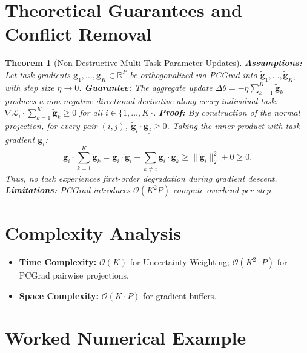 \documentclass[11pt]{article}
\newtheorem{theorem}{Theorem}
\begin{document}
\section{Theoretical Guarantees and Conflict Removal}
\label{sec:guarantees}

\begin{theorem}[Non-Destructive Multi-Task Parameter Updates]
\label{thm:pcgrad_non_destructive}
\textbf{Assumptions:} Let task gradients $\mathbf{g}_1, \dots, \mathbf{g}_K \in \mathbb{R}^P$ be orthogonalized via PCGrad into $\tilde{\mathbf{g}}_1, \dots, \tilde{\mathbf{g}}_K$, with step size $\eta \to 0$.
\textbf{Guarantee:} The aggregate update $\Delta\theta = -\eta \sum_{k=1}^K \tilde{\mathbf{g}}_k$ produces a non-negative directional derivative along every individual task: $\nabla\mathcal{L}_i \cdot \sum_{k=1}^K \tilde{\mathbf{g}}_k \ge 0$ for all $i \in \{1, \dots, K\}$.
\textbf{Proof:}
By construction of the normal projection, for every pair $(i, j)$, $\tilde{\mathbf{g}}_i \cdot \mathbf{g}_j \ge 0$.
Taking the inner product with task gradient $\mathbf{g}_i$:
\begin{equation}
\mathbf{g}_i \cdot \sum_{k=1}^K \tilde{\mathbf{g}}_k = \mathbf{g}_i \cdot \tilde{\mathbf{g}}_i + \sum_{k \neq i} \mathbf{g}_i \cdot \tilde{\mathbf{g}}_k \ge \|\tilde{\mathbf{g}}_i\|_2^2 + 0 \ge 0.
\end{equation}
Thus, no task experiences first-order degradation during gradient descent.
\textbf{Limitations:} PCGrad introduces $\mathcal{O}(K^2 P)$ compute overhead per step.
\end{theorem}

\section{Complexity Analysis}
\label{sec:complexity}

\begin{itemize}
    \item \textbf{Time Complexity:} $\mathcal{O}(K)$ for Uncertainty Weighting; $\mathcal{O}(K^2 \cdot P)$ for PCGrad pairwise projections.
    \item \textbf{Space Complexity:} $\mathcal{O}(K \cdot P)$ for gradient buffers.
\end{itemize}

\section{Worked Numerical Example}
\label{sec:worked_example}
\end{document}
